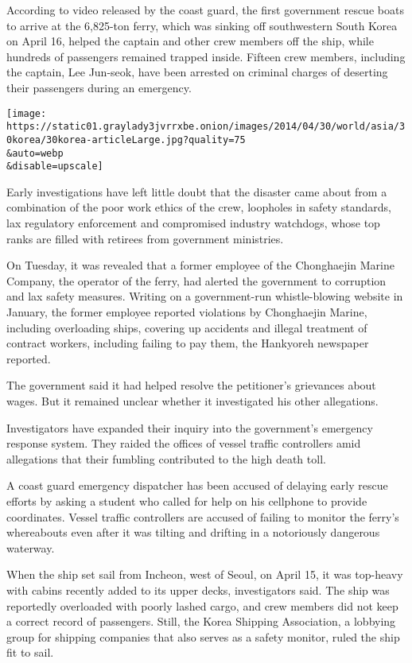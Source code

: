 According to video released by the coast guard, the first government
rescue boats to arrive at the 6,825-ton ferry, which was sinking off
southwestern South Korea on April 16, helped the captain and other crew
members off the ship, while hundreds of passengers remained trapped
inside. Fifteen crew members, including the captain, Lee Jun-seok, have
been arrested on criminal charges of deserting their passengers during
an emergency.

\texttt{[image: https://static01.graylady3jvrrxbe.onion/images/2014/04/30/world/asia/30korea/30korea-articleLarge.jpg?quality=75\\\&auto=webp\\\&disable=upscale]}

Early investigations have left little doubt that the disaster came about
from a combination of the poor work ethics of the crew, loopholes in
safety standards, lax regulatory enforcement and compromised industry
watchdogs, whose top ranks are filled with retirees from government
ministries.

On Tuesday, it was revealed that a former employee of the Chonghaejin
Marine Company, the operator of the ferry, had alerted the government to
corruption and lax safety measures. Writing on a government-run
whistle-blowing website in January, the former employee reported
violations by Chonghaejin Marine, including overloading ships, covering
up accidents and illegal treatment of contract workers, including
failing to pay them, the Hankyoreh newspaper reported.

The government said it had helped resolve the petitioner's grievances
about wages. But it remained unclear whether it investigated his other
allegations.

Investigators have expanded their inquiry into the government's
emergency response system. They raided the offices of vessel traffic
controllers amid allegations that their fumbling contributed to the high
death toll.

A coast guard emergency dispatcher has been accused of delaying early
rescue efforts by asking a student who called for help on his cellphone
to provide coordinates. Vessel traffic controllers are accused of
failing to monitor the ferry's whereabouts even after it was tilting and
drifting in a notoriously dangerous waterway.

When the ship set sail from Incheon, west of Seoul, on April 15, it was
top-heavy with cabins recently added to its upper decks, investigators
said. The ship was reportedly overloaded with poorly lashed cargo, and
crew members did not keep a correct record of passengers. Still, the
Korea Shipping Association, a lobbying group for shipping companies that
also serves as a safety monitor, ruled the ship fit to sail.

